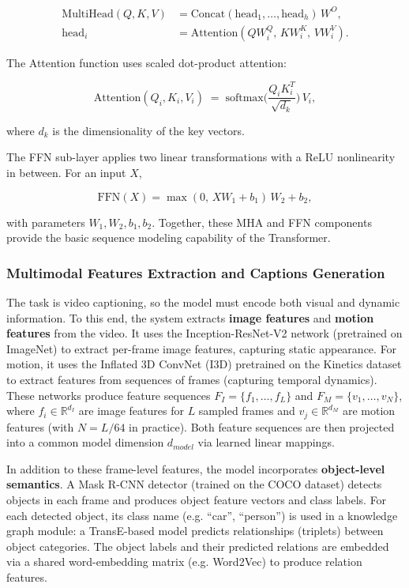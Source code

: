 \begin{equation}
\begin{split}
\mathrm{MultiHead}(Q,K,V)
  &= \mathrm{Concat}(\mathrm{head}_1,\dots,\mathrm{head}_h)\,W^O,\\
\mathrm{head}_i
  &= \mathrm{Attention}(QW_i^Q,\,KW_i^K,\,VW_i^V).
\end{split}
\label{eq:mha}
\end{equation}

The Attention function uses scaled dot-product attention:

$$
\mathrm{Attention}(Q_i,K_i,V_i) \;=\; \mathrm{softmax}\Big(\frac{Q_iK_i^T}{\sqrt{d_k}}\Big)\,V_i,
$$

where $d_k$ is the dimensionality of the key vectors.

The FFN sub-layer applies two linear transformations with a ReLU nonlinearity in between. For an input $X$,

$$
\mathrm{FFN}(X) = \max(0,\,XW_1 + b_1)\,W_2 + b_2,
$$

with parameters $W_1,W_2,b_1,b_2$. Together, these MHA and FFN components provide the basic sequence modeling capability of the Transformer.

\subsubsection{Multimodal Features Extraction and Captions Generation}

The task is video captioning, so the model must encode both visual and dynamic information. To this end, the system extracts \textbf{image features} and \textbf{motion features} from the video. It uses the Inception-ResNet-V2 network (pretrained on ImageNet) to extract per-frame image features, capturing static appearance. For motion, it uses the Inflated 3D ConvNet (I3D) pretrained on the Kinetics dataset to extract features from sequences of frames (capturing temporal dynamics). These networks produce feature sequences $F_I=\{f_1,\dots,f_L\}$ and $F_M=\{v_1,\dots,v_N\}$, where $f_i\in\mathbb{R}^{d_I}$ are image features for $L$ sampled frames and $v_j\in\mathbb{R}^{d_M}$ are motion features (with $N=L/64$ in practice). Both feature sequences are then projected into a common model dimension $d_{model}$ via learned linear mappings.

In addition to these frame-level features, the model incorporates \textbf{object-level semantics}. A Mask R-CNN detector (trained on the COCO dataset) detects objects in each frame and produces object feature vectors and class labels. For each detected object, its class name (e.g. ``car'', ``person'') is used in a knowledge graph module: a TransE-based model predicts relationships (triplets) between object categories. The object labels and their predicted relations are embedded via a shared word-embedding matrix (e.g. Word2Vec) to produce relation features.

